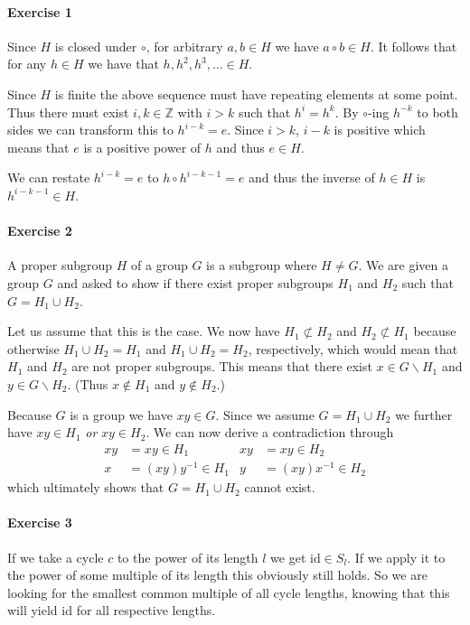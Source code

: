 \documentclass{article}
\newcommand{\id}{\text{id}}
\begin{document}
\paragraph{Exercise 1}

Since $H$ is closed under $\circ$, for arbitrary $a, b \in H$ we have $a \circ b \in H$. It follows that for any $h \in H$ we have that $h, h^2, h^3, \ldots \in H$.

Since $H$ is finite the above sequence must have repeating elements at some point. Thus there must exist $i, k \in \mathbb{Z}$ with $i > k$ such that $h^i = h^k$. By $\circ$-ing $h^{-k}$ to both sides we can transform this to $h^{i - k} = e$. Since $i > k$, $i - k$ is positive which means that $e$ is a positive power of $h$ and thus $e \in H$.

We can restate $h^{i - k} = e$ to $h \circ h^{i - k - 1} = e$ and thus the inverse of $h \in H$ is $h^{i - k - 1} \in H$.

\paragraph{Exercise 2}

A proper subgroup $H$ of a group $G$ is a subgroup where $H \neq G$. We are given a group $G$ and asked to show if there exist proper subgroups $H_1$ and $H_2$ such that $G = H_1 \cup H_2$.

Let us assume that this is the case. We now have $H_1 \not\subset H_2$ and $H_2 \not\subset H_1$ because otherwise $H_1 \cup H_2 = H_1$ and $H_1 \cup H_2 = H_2$, respectively, which would mean that $H_1$ and $H_2$ are not proper subgroups. This means that there exist $x \in G \backslash H_1$ and $y \in G \backslash H_2$. (Thus $x \not\in H_1$ and $y \not\in H_2$.)

Because $G$ is a group we have $xy \in G$. Since we assume $G = H_1 \cup H_2$ we further have $xy \in H_1$ \emph{or} $xy \in H_2$. We can now derive a contradiction through
\begin{align*}
    xy &= xy \in H_1 & xy &= xy \in H_2 \\
    x &= (xy)y^{-1} \in H_1 & y &= (xy)x^{-1} \in H_2
\end{align*}
which ultimately shows that $G = H_1 \cup H_2$ cannot exist.

\paragraph{Exercise 3}

If we take a cycle $c$ to the power of its length $l$ we get $\id \in S_{l}$. If we apply it to the power of some multiple of its length this obviously still holds. So we are looking for the smallest common multiple of all cycle lengths, knowing that this will yield $\id$ for all respective lengths.
\end{document}
